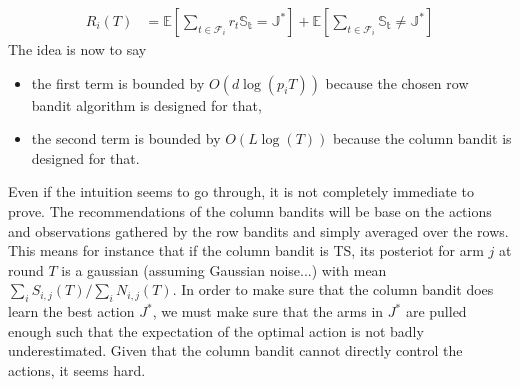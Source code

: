 \begin{align*}
R_i(T) &= \mathds{E}\left[\sum_{t \in \mathcal{F}_i} r_t \mathds{S_t = J^*} \right] + \mathds{E}\left[\sum_{t \in \mathcal{F}_i} \mathds{S_t \neq J^*} \right]
\end{align*}
The idea is now to say
\begin{itemize}
\item the first term is bounded by $O(d\log (p_iT))$ because the chosen row bandit algorithm is designed for that,
\item the second term is bounded by $O(L\log(T))$ because the column bandit is designed for that.
\end{itemize}

Even if the intuition seems to go through, it is not completely immediate to prove.
The recommendations of the column bandits will be base on the actions and observations gathered by the row bandits and simply averaged over the rows. This means for instance that if the column bandit is TS,
its posteriot for arm $j$ at round $T$ is a gaussian (assuming Gaussian noise...) with mean $\sum_i S_{i,j}(T)/ \sum_i N_{i,j}(T)$. In order to make sure that the column bandit does learn the best action $J^*$, we must make sure that the arms in $J^*$ are pulled enough such that the expectation of the optimal action is not badly underestimated. Given that the column bandit cannot directly control the actions, it seems hard.
